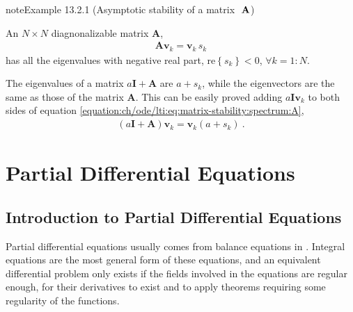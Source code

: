 \documentclass[letterpaper,10pt,english]{jupyterBook}
\begin{document}
\begin{sphinxadmonition}{note}{Example 13.2.1 (Asymptotic stability of a matrix \protect\(\ \mathbf{A}\protect\))}



\sphinxAtStartPar
An \(N \times N\) diagnonalizable matrix \(\mathbf{A}\),
\begin{equation}\label{equation:ch/ode/lti:eq:matrix-stability:spectrum:A}
\begin{split}\mathbf{A} \mathbf{v}_k = \mathbf{v}_k \, s_k\end{split}
\end{equation}
\sphinxAtStartPar
has all the eigenvalues with negative real part, \(\text{re}\left\{ s_k \right\} < 0\), \(\forall k=1:N\).

\sphinxAtStartPar
The eigenvalues of a matrix \(a \mathbf{I} + \mathbf{A}\) are \(a + s_k\), while the eigenvectors are the same as those of the matrix \(\mathbf{A}\). This can be easily proved adding \(a \mathbf{I} \mathbf{v}_k\) to both sides of equation \eqref{equation:ch/ode/lti:eq:matrix-stability:spectrum:A},
\begin{equation*}
\begin{split}\left( a \mathbf{I} + \mathbf{A} \right) \mathbf{v}_k = \mathbf{v}_k (a + s_k) \ .\end{split}
\end{equation*}\end{sphinxadmonition}

\sphinxAtStartPar
{}

\sphinxstepscope


\part{Partial Differential Equations}

\sphinxstepscope


\chapter{Introduction to Partial Differential Equations}
\label{\detokenize{ch/pde/intro:introduction-to-partial-differential-equations}}\label{\detokenize{ch/pde/intro:pde}}\label{\detokenize{ch/pde/intro::doc}}
\sphinxAtStartPar
Partial differential equations usually comes from balance equations in . Integral equations are the most general form of these equations, and an equivalent differential problem only exists if the fields involved in the equations are regular enough, for their derivatives to exist \sphinxhyphen{} and to apply theorems requiring some regularity of the functions.
\end{document}
